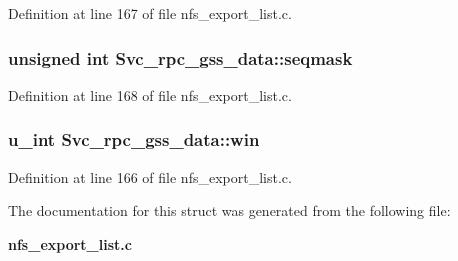 Definition at line 167 of file nfs\_\-export\_\-list.c.
\subsubsection{\setlength{\rightskip}{0pt plus 5cm}unsigned int {\bf Svc\_\-rpc\_\-gss\_\-data::seqmask}}\label{structSvc__rpc__gss__data_o7}




Definition at line 168 of file nfs\_\-export\_\-list.c.
\subsubsection{\setlength{\rightskip}{0pt plus 5cm}u\_\-int {\bf Svc\_\-rpc\_\-gss\_\-data::win}}\label{structSvc__rpc__gss__data_o5}




Definition at line 166 of file nfs\_\-export\_\-list.c.

The documentation for this struct was generated from the following file:\begin{CompactItemize}
\item 
{\bf nfs\_\-export\_\-list.c}\end{CompactItemize}
